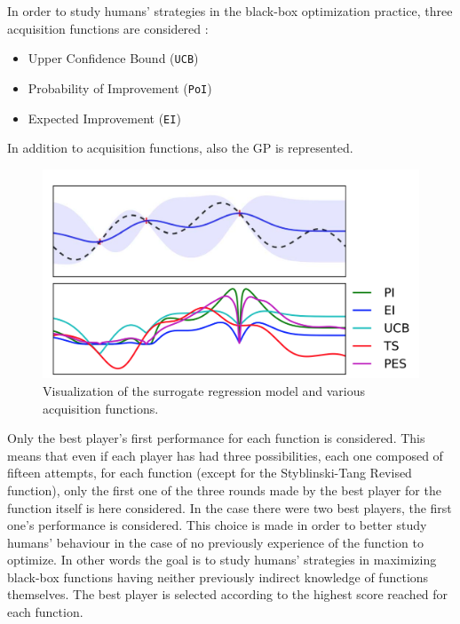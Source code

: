 In order to study humans' strategies in the black-box optimization practice, three acquisition functions are considered :

\begin{itemize}
	\item Upper Confidence Bound ({\tt UCB})
	\item Probability of Improvement ({\tt PoI})
	\item Expected Improvement ({\tt EI})
\end{itemize}

In addition to acquisition functions, also the GP is represented. \\ 

\begin{figure} [h!]
	\centering
	\includegraphics[width=\linewidth]{IMAGES/Surrogate}
	\caption{Visualization of the surrogate regression model and various acquisition functions\cite{DBLP:journals/pieee/ShahriariSWAF16}.}
	\label{fig:surrogate}
\end{figure}

Only the best player's first performance for each function is considered. This means that even if each player has had three possibilities, each one composed of fifteen attempts, for each function (except for the Styblinski-Tang Revised function), only the first one of the three rounds made by the best player for the function itself is here considered. In the case there were two best players, the first one's performance is considered. This choice is made in order to better study humans' behaviour in the case of no previously experience of the function to optimize. In other words the goal is to study humans' strategies in maximizing black-box functions having neither previously indirect knowledge of functions themselves. The best player is selected according to the highest score reached for each function. \\

